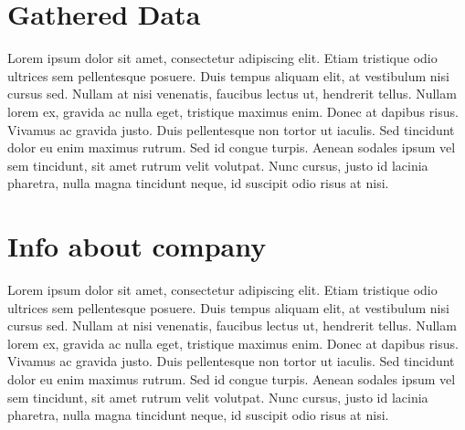 \documentclass[11pt, a4paper]{resources/JTH}
\begin{document}
\newpage
\begin{appendices}

\section{Gathered Data}

    Lorem ipsum dolor sit amet, consectetur adipiscing elit. Etiam tristique odio ultrices sem pellentesque posuere. Duis tempus aliquam elit, at vestibulum nisi cursus sed. Nullam at nisi venenatis, faucibus lectus ut, hendrerit tellus. Nullam lorem ex, gravida ac nulla eget, tristique maximus enim. Donec at dapibus risus. Vivamus ac gravida justo. Duis pellentesque non tortor ut iaculis. Sed tincidunt dolor eu enim maximus rutrum. Sed id congue turpis. Aenean sodales ipsum vel sem tincidunt, sit amet rutrum velit volutpat. Nunc cursus, justo id lacinia pharetra, nulla magna tincidunt neque, id suscipit odio risus at nisi.
    
\section{Info about company}

    Lorem ipsum dolor sit amet, consectetur adipiscing elit. Etiam tristique odio ultrices sem pellentesque posuere. Duis tempus aliquam elit, at vestibulum nisi cursus sed. Nullam at nisi venenatis, faucibus lectus ut, hendrerit tellus. Nullam lorem ex, gravida ac nulla eget, tristique maximus enim. Donec at dapibus risus. Vivamus ac gravida justo. Duis pellentesque non tortor ut iaculis. Sed tincidunt dolor eu enim maximus rutrum. Sed id congue turpis. Aenean sodales ipsum vel sem tincidunt, sit amet rutrum velit volutpat. Nunc cursus, justo id lacinia pharetra, nulla magna tincidunt neque, id suscipit odio risus at nisi.

\end{appendices}
\end{document}
